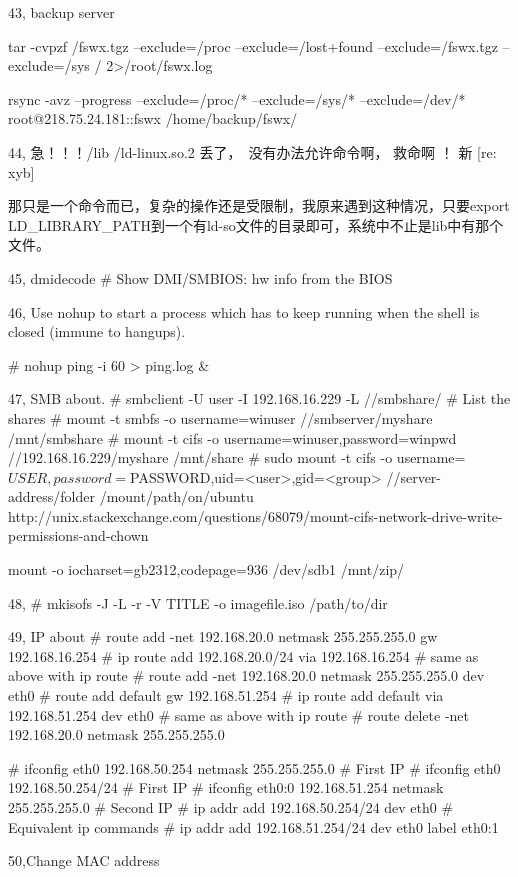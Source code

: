 43, backup server

tar -cvpzf /fswx.tgz --exclude=/proc --exclude=/lost+found --exclude=/fswx.tgz --exclude=/sys / 2>/root/fswx.log

rsync -avz --progress --exclude=/proc/* --exclude=/sys/* --exclude=/dev/* root@218.75.24.181::fswx /home/backup/fswx/

44, 急！！！/lib /ld-linux.so.2 丢了，　没有办法允许命令啊， 救命啊 ！ 新  [re: xyb]	 

那只是一个命令而已，复杂的操作还是受限制，我原来遇到这种情况，只要export LD_LIBRARY_PATH到一个有ld-so文件的目录即可，系统中不止是lib中有那个文件。 

45, dmidecode                          # Show DMI/SMBIOS: hw info from the BIOS

46, Use nohup to start a process which has to keep running when the shell is closed (immune to hangups).

# nohup ping -i 60 > ping.log &

47, SMB about.
# smbclient -U user -I 192.168.16.229 -L //smbshare/    # List the shares
# mount -t smbfs -o username=winuser //smbserver/myshare /mnt/smbshare
# mount -t cifs -o username=winuser,password=winpwd //192.168.16.229/myshare /mnt/share
# sudo mount -t cifs -o username=${USER},password=${PASSWORD},uid=<user>,gid=<group> //server-address/folder /mount/path/on/ubuntu
http://unix.stackexchange.com/questions/68079/mount-cifs-network-drive-write-permissions-and-chown

mount -o iocharset=gb2312,codepage=936 /dev/sdb1 /mnt/zip/

48, # mkisofs -J -L -r -V TITLE -o imagefile.iso /path/to/dir

49, IP about
# route add -net 192.168.20.0 netmask 255.255.255.0 gw 192.168.16.254
# ip route add 192.168.20.0/24 via 192.168.16.254       # same as above with ip route
# route add -net 192.168.20.0 netmask 255.255.255.0 dev eth0
# route add default gw 192.168.51.254
# ip route add default via 192.168.51.254 dev eth0      # same as above with ip route
# route delete -net 192.168.20.0 netmask 255.255.255.0

# ifconfig eth0 192.168.50.254 netmask 255.255.255.0       # First IP
# ifconfig eth0 192.168.50.254/24       # First IP
# ifconfig eth0:0 192.168.51.254 netmask 255.255.255.0     # Second IP
# ip addr add 192.168.50.254/24 dev eth0                   # Equivalent ip commands
# ip addr add 192.168.51.254/24 dev eth0 label eth0:1

50,Change MAC address

